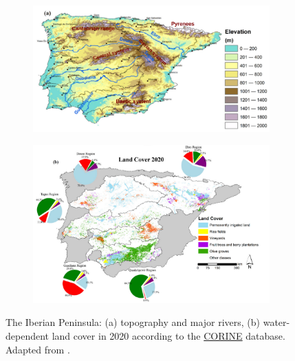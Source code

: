 

\begin{figure}[ht]
    \centering
    \begin{subfigure}{\textwidth}
        \includegraphics[width=\linewidth]{images/intro/ip_topography_fonseca_mountains.png}
    \end{subfigure}
    \begin{subfigure}{\textwidth}
        \includegraphics[width=\linewidth]{images/intro/land_cover_fonseca.png}
    \end{subfigure}
    \caption{The Iberian Peninsula: (a) topography and major rivers, (b) water-dependent land cover in 2020 according to the \href{https://land.copernicus.eu/en/products/corine-land-cover}{CORINE} database. Adapted from \citet{fonseca_agricultural_2022}.}
    \label{fig:IP_map_fonseca}
\end{figure}


\hfill

